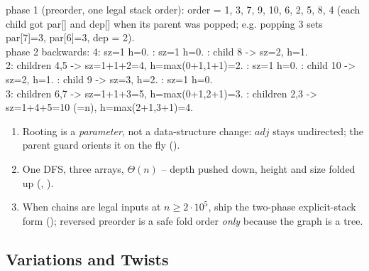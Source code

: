 \begin{tracebox}
phase 1 (preorder, one legal stack order): order = 1, 3, 7, 9, 10, 6, 2, 5, 8, 4
(each child got par[] and dep[] when its parent was popped; e.g. popping 3 sets
par[7]=3, par[6]=3, dep = 2).\\
phase 2 backwards: 4: sz=1 h=0. \;: sz=1 h=0. \;: child 8 -> sz=2, h=1.\\
2: children 4,5 -> sz=1+1+2=4, h=max(0+1,1+1)=2. \;: sz=1 h=0. \;: child 10 -> sz=2, h=1. \;: child 9 -> sz=3, h=2. \;: sz=1 h=0.\\
3: children 6,7 -> sz=1+1+3=5, h=max(0+1,2+1)=3. \;: children 2,3 -> sz=1+4+5=10 \checkmark (=n), h=max(2+1,3+1)=4. \;\;\checkmark
\end{tracebox}

\begin{insightbox}
\begin{enumerate}[nosep, leftmargin=1.6em]
  \item Rooting is a \emph{parameter}, not a data-structure change: $\mathit{adj}$ stays
        undirected; the parent guard orients it on the fly ().
  \item One DFS, three arrays, $\Theta(n)$ -- depth pushed down, height and size folded
        up (, ).
  \item When chains are legal inputs at $n \ge 2\cdot 10^{5}$, ship the two-phase
        explicit-stack form (); reversed preorder is a safe fold order
        \emph{only} because the graph is a tree.
\end{enumerate}
\end{insightbox}

\subsection{Variations and Twists}

